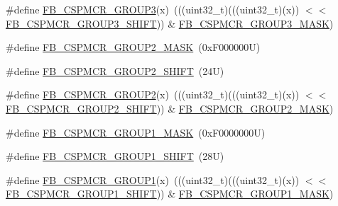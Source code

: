 \begin{DoxyCompactItemize}
\item 
\#define \mbox{\hyperlink{group___f_b___register___masks_ga5f46c89a4298c3b2b367d829487dcb4b}{F\+B\+\_\+\+C\+S\+P\+M\+C\+R\+\_\+\+G\+R\+O\+U\+P3}}(x)~(((uint32\+\_\+t)(((uint32\+\_\+t)(x)) $<$$<$ \mbox{\hyperlink{group___f_b___register___masks_ga9f0b849b6cb1a2f629dcd23a0a0a4306}{F\+B\+\_\+\+C\+S\+P\+M\+C\+R\+\_\+\+G\+R\+O\+U\+P3\+\_\+\+S\+H\+I\+FT}})) \& \mbox{\hyperlink{group___f_b___register___masks_gac53d0fcbc3464725ceda1d20147fe98c}{F\+B\+\_\+\+C\+S\+P\+M\+C\+R\+\_\+\+G\+R\+O\+U\+P3\+\_\+\+M\+A\+SK}})
\item 
\#define \mbox{\hyperlink{group___f_b___register___masks_ga594596b281baba23e03cb37fbf0a05db}{F\+B\+\_\+\+C\+S\+P\+M\+C\+R\+\_\+\+G\+R\+O\+U\+P2\+\_\+\+M\+A\+SK}}~(0x\+F000000\+U)
\item 
\#define \mbox{\hyperlink{group___f_b___register___masks_ga332a2c4e7103b2f21af54da036518928}{F\+B\+\_\+\+C\+S\+P\+M\+C\+R\+\_\+\+G\+R\+O\+U\+P2\+\_\+\+S\+H\+I\+FT}}~(24\+U)
\item 
\#define \mbox{\hyperlink{group___f_b___register___masks_ga90ca2c9ade016544de01e8ff18906bdc}{F\+B\+\_\+\+C\+S\+P\+M\+C\+R\+\_\+\+G\+R\+O\+U\+P2}}(x)~(((uint32\+\_\+t)(((uint32\+\_\+t)(x)) $<$$<$ \mbox{\hyperlink{group___f_b___register___masks_ga332a2c4e7103b2f21af54da036518928}{F\+B\+\_\+\+C\+S\+P\+M\+C\+R\+\_\+\+G\+R\+O\+U\+P2\+\_\+\+S\+H\+I\+FT}})) \& \mbox{\hyperlink{group___f_b___register___masks_ga594596b281baba23e03cb37fbf0a05db}{F\+B\+\_\+\+C\+S\+P\+M\+C\+R\+\_\+\+G\+R\+O\+U\+P2\+\_\+\+M\+A\+SK}})
\item 
\#define \mbox{\hyperlink{group___f_b___register___masks_ga735fd2a0040e9ad1122a3c3fc8e28193}{F\+B\+\_\+\+C\+S\+P\+M\+C\+R\+\_\+\+G\+R\+O\+U\+P1\+\_\+\+M\+A\+SK}}~(0x\+F0000000\+U)
\item 
\#define \mbox{\hyperlink{group___f_b___register___masks_ga9c83850dcb3efe92a0404101e5afbdca}{F\+B\+\_\+\+C\+S\+P\+M\+C\+R\+\_\+\+G\+R\+O\+U\+P1\+\_\+\+S\+H\+I\+FT}}~(28\+U)
\item 
\#define \mbox{\hyperlink{group___f_b___register___masks_gad8cfbe8c479a928d91e215283db376af}{F\+B\+\_\+\+C\+S\+P\+M\+C\+R\+\_\+\+G\+R\+O\+U\+P1}}(x)~(((uint32\+\_\+t)(((uint32\+\_\+t)(x)) $<$$<$ \mbox{\hyperlink{group___f_b___register___masks_ga9c83850dcb3efe92a0404101e5afbdca}{F\+B\+\_\+\+C\+S\+P\+M\+C\+R\+\_\+\+G\+R\+O\+U\+P1\+\_\+\+S\+H\+I\+FT}})) \& \mbox{\hyperlink{group___f_b___register___masks_ga735fd2a0040e9ad1122a3c3fc8e28193}{F\+B\+\_\+\+C\+S\+P\+M\+C\+R\+\_\+\+G\+R\+O\+U\+P1\+\_\+\+M\+A\+SK}})
\end{DoxyCompactItemize}


